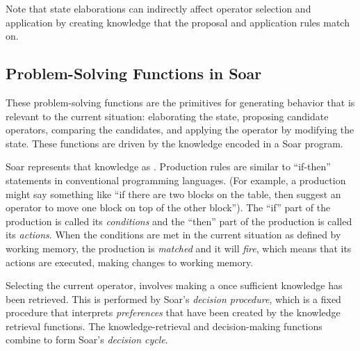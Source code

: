 Note that state elaborations can indirectly affect operator selection
and application by creating knowledge that the proposal and application
rules match on.

\subsection{Problem-Solving Functions in Soar}
\label{ARCH-functions}

These problem-solving functions are the primitives for generating 
behavior that is relevant to the current situation: elaborating the 
state, proposing candidate operators, comparing the candidates, 
and applying the operator by modifying the state. 
These functions are driven by the knowledge encoded in a Soar program.
 
Soar represents that knowledge as .  
Production rules are similar to ``if-then'' statements in conventional 
programming languages. (For example, a
production might say something like ``if there are two blocks on the
table, then suggest an operator to move one block on top of the other
block'').  The ``if'' part of the production is called its
\textit{conditions} and the ``then'' part of the production is called
its \textit{actions}. When the conditions are met in the current
situation as defined by working memory, the production is \emph{matched}
and it will \emph{fire}, which means that its actions are executed,
making changes to working memory.

Selecting the current operator, involves making a
 once sufficient knowledge has been retrieved.  This is
performed by Soar's \emph{decision procedure}, which is a fixed
procedure that interprets \emph{preferences} that have been created by
the knowledge retrieval functions. The knowledge-retrieval and decision-making
functions combine to form Soar's \emph{decision cycle}.

